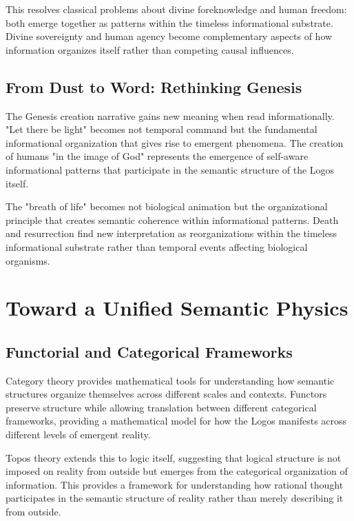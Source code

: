 \documentclass[12pt]{article}
\begin{document}
This resolves classical problems about divine foreknowledge and human freedom: both emerge together as patterns within the timeless informational substrate. Divine sovereignty and human agency become complementary aspects of how information organizes itself rather than competing causal influences.

\subsection{From Dust to Word: Rethinking Genesis}

The Genesis creation narrative gains new meaning when read informationally. "Let there be light" becomes not temporal command but the fundamental informational organization that gives rise to emergent phenomena. The creation of humans "in the image of God" represents the emergence of self-aware informational patterns that participate in the semantic structure of the Logos itself.

The "breath of life" becomes not biological animation but the organizational principle that creates semantic coherence within informational patterns. Death and resurrection find new interpretation as reorganizations within the timeless informational substrate rather than temporal events affecting biological organisms.

\section{Toward a Unified Semantic Physics}

\subsection{Functorial and Categorical Frameworks}

Category theory provides mathematical tools for understanding how semantic structures organize themselves across different scales and contexts. Functors preserve structure while allowing translation between different categorical frameworks, providing a mathematical model for how the Logos manifests across different levels of emergent reality.

Topos theory extends this to logic itself, suggesting that logical structure is not imposed on reality from outside but emerges from the categorical organization of information. This provides a framework for understanding how rational thought participates in the semantic structure of reality rather than merely describing it from outside.
\end{document}
